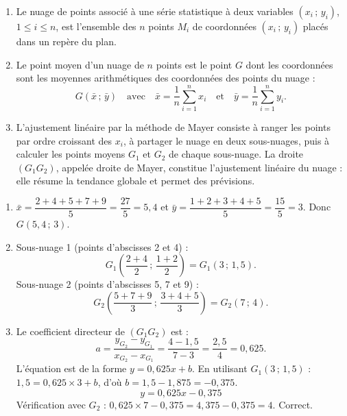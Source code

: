 \documentclass[11pt]{article}
\newcommand{\cle}[1]{{\popxbold\color{popdark}#1}}
\newcounter{popsec}
\newcounter{popsub}
\newcommand{\courssub}[1]{%
  \stepcounter{popsub}%
  \par\vspace{9pt}\noindent{\popxbold\fontsize{11.5}{13}\selectfont\color{popink}{\color{poporange}\thepopsec.\thepopsub}\hspace{6pt}#1}\par\nopagebreak\vspace{4pt}
}
\begin{document}
\begin{corrige}
\begin{enumerate}
\item Le \cle{nuage de points} associé à une série statistique à deux variables $(x_i\,;\,y_i)$, $1\le i\le n$, est l'ensemble des $n$ points $M_i$ de coordonnées $(x_i\,;\,y_i)$ placés dans un repère du plan.
\item Le \cle{point moyen} d'un nuage de $n$ points est le point $G$ dont les coordonnées sont les moyennes arithmétiques des coordonnées des points du nuage :
\[ G\left(\bar{x}\,;\,\bar{y}\right) \quad \text{avec} \quad \bar{x}=\frac{1}{n}\sum_{i=1}^{n}x_i \quad \text{et} \quad \bar{y}=\frac{1}{n}\sum_{i=1}^{n}y_i. \]
\item L'\cle{ajustement linéaire par la méthode de Mayer} consiste à ranger les points par ordre croissant des $x_i$, à partager le nuage en deux sous-nuages, puis à calculer les points moyens $G_1$ et $G_2$ de chaque sous-nuage. La droite $(G_1G_2)$, appelée droite de Mayer, constitue l'ajustement linéaire du nuage : elle résume la tendance globale et permet des prévisions.
\end{enumerate}
\end{corrige}

\begin{corrige}
\begin{enumerate}
\item $\bar{x}=\dfrac{2+4+5+7+9}{5}=\dfrac{27}{5}=5{,}4$ et $\bar{y}=\dfrac{1+2+3+4+5}{5}=\dfrac{15}{5}=3$. Donc $G(5{,}4\,;\,3)$.
\item Sous-nuage 1 (points d'abscisses 2 et 4) :
\[ G_1\left(\frac{2+4}{2}\,;\,\frac{1+2}{2}\right) = G_1(3\,;\,1{,}5). \]
Sous-nuage 2 (points d'abscisses 5, 7 et 9) :
\[ G_2\left(\frac{5+7+9}{3}\,;\,\frac{3+4+5}{3}\right) = G_2(7\,;\,4). \]
\item Le coefficient directeur de $(G_1G_2)$ est :
\[ a=\frac{y_{G_2}-y_{G_1}}{x_{G_2}-x_{G_1}}=\frac{4-1{,}5}{7-3}=\frac{2{,}5}{4}=0{,}625. \]
L'équation est de la forme $y=0{,}625x+b$. En utilisant $G_1(3\,;\,1{,}5)$ : $1{,}5=0{,}625\times 3+b$, d'où $b=1{,}5-1{,}875=-0{,}375$.
\[ \boxed{y=0{,}625x-0{,}375} \]
Vérification avec $G_2$ : $0{,}625\times 7-0{,}375=4{,}375-0{,}375=4$. Correct.
\end{enumerate}
\end{corrige}

\courssub{Je m'entraîne}
\end{document}
